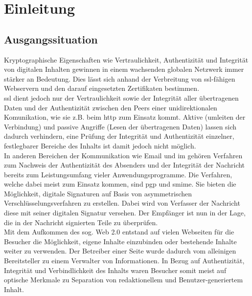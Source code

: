 
\chapter{Einleitung}
%
\label{chp:Einleitung}

\section{Ausgangssituation}
%
\label{sec:Einleitung:ausgangssituation}
Kryptographische Eigenschaften wie Vertraulichkeit, Authentizität und Integrität von digitalen Inhalten gewinnen in einem wachsenden globalen Netzwerk immer
stärker an Bedeutung. Dies lässt sich anhand der Verbreitung von \gls{ssl}-fähigen Webservern und den darauf eingesetzten Zertifikaten bestimmen\cite{ssliverse:eff}.\\

\gls{ssl} dient jedoch nur der Vertraulichkeit sowie der Integrität aller übertragenen Daten und der Authentizität zwischen den Peers einer unidirektionalen
Komunikation, wie sie z.B. beim \gls{http} zum Einsatz kommt\cite{}. Aktive (umleiten der Verbindung) und passive Angriffe (Lesen der übertragenen Daten) lassen sich dadurch
verhindern, eine Prüfung der Integrität und Authentizität einzelner, festlegbarer Bereiche des Inhalts ist damit jedoch nicht möglich.\\

In anderen Bereichen der Kommunikation wie Email und \gls{im} gehören Verfahren zum Nachweis der Authentizität des Absenders und der Integrität der Nachricht
bereits zum Leistungsumfang vieler Anwendungsprogramme\cite{}. Die Verfahren, welche dabei meist zum Einsatz kommen, sind \gls{pgp} und \gls{smime}. Sie bieten die
Möglichkeit, digitale Signaturen auf Basis von asymmetrischen Verschlüsselungsverfahren zu erstellen. Dabei wird von Verfasser der Nachricht diese mit seiner
digitalen Signatur versehen. Der Empfänger ist nun in der Lage, die in der Nachricht signierten Teile zu überprüfen.\\

Mit dem Aufkommen des sog. Web 2.0 entstand auf vielen Webseiten für die Besucher die Möglichkeit, eigene Inhalte einzubinden oder bestehende Inhalte weiter zu
verwenden. Der Betreiber einer Seite wurde dadurch vom alleinigen Bereitsteller zu einem Verwalter von Informationen. In Bezug auf Authentizität, Integrität und
Verbindlichkeit des Inhalts waren Besucher somit meist auf optische Merkmale zu Separation von redaktionellem und Benutzer-generiertem Inhalt. \\

